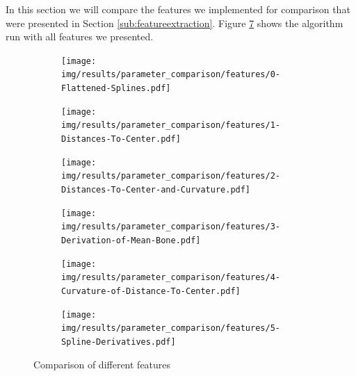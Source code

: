\documentclass[pdftex,12pt,a4paper]{report}
\begin{document}
In this section we will compare the features we implemented for comparison that were presented in Section \ref{sub:featureextraction}. Figure \ref{fig:features} shows the algorithm run with all features we presented.

\begin{figure}[h]
	\centering
	\begin{subfigure}[b]{0.32\textwidth}
		\centering
		\texttt{[image: img/results/parameter\_comparison/features/0-Flattened-Splines.pdf]}
		\label{fig:features-0}
	\end{subfigure}
	\begin{subfigure}[b]{0.32\textwidth}
		\centering
		\texttt{[image: img/results/parameter\_comparison/features/1-Distances-To-Center.pdf]}
		\label{fig:features-1}
	\end{subfigure}
	\begin{subfigure}[b]{0.32\textwidth}
		\centering
		\texttt{[image: img/results/parameter\_comparison/features/2-Distances-To-Center-and-Curvature.pdf]}
		\label{fig:features-2}
	\end{subfigure}
	\begin{subfigure}[b]{0.32\textwidth}
		\centering
		\texttt{[image: img/results/parameter\_comparison/features/3-Derivation-of-Mean-Bone.pdf]}
		\label{fig:features-3}
	\end{subfigure}
	\begin{subfigure}[b]{0.32\textwidth}
		\centering
		\texttt{[image: img/results/parameter\_comparison/features/4-Curvature-of-Distance-To-Center.pdf]}
		\label{fig:features-4}
	\end{subfigure}
	\begin{subfigure}[b]{0.32\textwidth}
		\centering
		\texttt{[image: img/results/parameter\_comparison/features/5-Spline-Derivatives.pdf]}
		\label{fig:features-5}
	\end{subfigure}
	\caption{Comparison of different features}
	\label{fig:features}
\end{figure}
\end{document}
